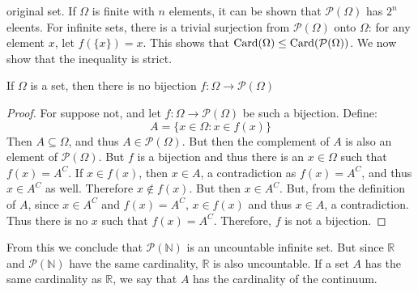             original set. If $\Omega$ is finite with $n$ elements, it
            can be shown that $\mathcal{P}(\Omega)$ has $2^{n}$
            eleents. For infinite sets, there is a trivial surjection
            from $\mathcal{P}(\Omega)$ onto $\Omega$: for any element
            $x$, let $f(\{x\})=x$. This shows that
            $\operatorname{Card}(\Omega)\leq\operatorname{Card}(\mathcal{P}(\Omega))$. We now show
            that the inequality is strict.
            \begin{theorem}
                If $\Omega$ is a set, then there is no bijection
                $f:\Omega\rightarrow\mathcal{P}(\Omega)$
            \end{theorem}
            \begin{proof}
                For suppose not, and let
                $f:\Omega\rightarrow\mathcal{P}(\Omega)$ be such a
                bijection. Define:
                \begin{equation}
                    A=\{x\in\Omega:x\in{f}(x)\}
                \end{equation}
                Then $A\subseteq\Omega$, and thus
                $A\in\mathcal{P}(\Omega)$. But then the complement of
                $A$ is also an element of $\mathcal{P}(\Omega)$. But
                $f$ is a bijection and thus there is an $x\in\Omega$
                such that $f(x)=A^{C}$. If $x\in{f}(x)$, then
                $x\in{A}$, a contradiction as $f(x)=A^{C}$, and thus
                $x\in{A}^{C}$ as well. Therefore $x\notin{f}(x)$. But
                then $x\in{A}^{C}$. But, from the definition of $A$,
                since $x\in{A}^{C}$ and $f(x)=A^{C}$, $x\in{f}(x)$
                and thus $x\in{A}$, a contradiction. Thus there is no
                $x$ such that $f(x)=A^{C}$. Therefore, $f$ is not a
                bijection.
            \end{proof}
            From this we conclude that $\mathcal{P}(\mathbb{N})$
            is an uncountable infinite set. But since $\mathbb{R}$
            and $\mathcal{P}(\mathbb{N})$ have the same cardinality,
            $\mathbb{R}$ is also uncountable.
            If a set $A$ has the same cardinality as $\mathbb{R}$,
            we say that $A$ has the cardinality of the continuum.
